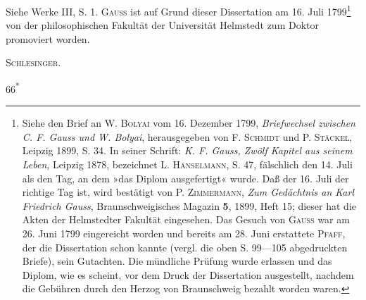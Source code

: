 \medskip\begingroup\small
\indent Siehe Werke III, S. 1. \textsc{Gauss} ist auf Grund dieser Dissertation am 16. Juli 1799\begingroup\renewcommand{\thefootnote}{**)}\footnote{Siehe den Brief an W. \textsc{Bolyai} vom 16. Dezember 1799, \textit{Briefwechsel zwischen C. F. Gauss und W. Bolyai}, herausgegeben von F. \textsc{Schmidt} und P. \textsc{Stäckel}, Leipzig 1899, S. 34. In seiner Schrift: \textit{K. F. Gauss, Zwölf Kapitel aus seinem Leben}, Leipzig 1878, bezeichnet L. \textsc{Hänselmann}, S. 47, fälschlich den 14. Juli als den Tag, an dem »das Diplom ausgefertigt« wurde. Daß der 16. Juli der richtige Tag ist, wird bestätigt von P. \textsc{Zimmermann}, \textit{Zum Gedächtnis an Karl Friedrich Gauss}, Braunschweigisches Magazin \textbf{5}, 1899, Heft 15; dieser hat die Akten der Helmstedter Fakultät eingesehen. Das Gesuch von \textsc{Gauss} war am 26. Juni 1799 eingereicht worden und bereits am 28. Juni erstattete \textsc{Pfaff}, der die Dissertation schon kannte (vergl. die oben S. 99—105 abgedruckten Briefe), sein Gutachten. Die mündliche Prüfung wurde erlassen und das Diplom, wie es scheint, vor dem Druck der Dissertation ausgestellt, nachdem die Gebühren durch den Herzog von Braunschweig bezahlt worden waren.}\endgroup{} von der philosophischen Fakultät der Universität Helmstedt zum Doktor promoviert worden.
\par\noindent\hfill\textsc{Schlesinger.}
\par\endgroup
\par\vfill\noindent\hfill66\textsuperscript{*}
